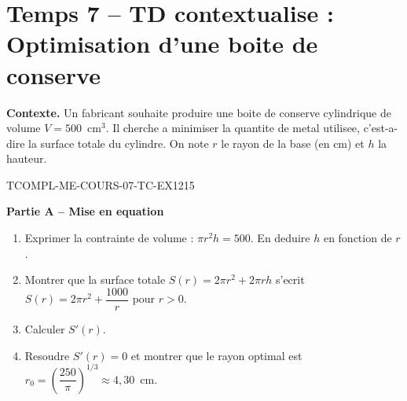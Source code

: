 

\section*{Temps 7 -- TD contextualise : Optimisation d'une boite de conserve}

\textbf{Contexte.} Un fabricant souhaite produire une boite de conserve cylindrique de volume $V = 500$~cm$^3$. Il cherche a minimiser la quantite de metal utilisee, c'est-a-dire la surface totale du cylindre. On note $r$ le rayon de la base (en cm) et $h$ la hauteur.

\bigskip


\begin{exercice}{TCOMPL-ME-COURS-07-TC-EX1}{2}{15}

\textbf{Partie A -- Mise en equation}

\begin{enumerate}
  \item Exprimer la contrainte de volume : $\pi r^2 h = 500$. En deduire $h$ en fonction de $r$.
  \item Montrer que la surface totale $S(r) = 2\pi r^2 + 2\pi r h$ s'ecrit $S(r) = 2\pi r^2 + \dfrac{1000}{r}$ pour $r > 0$.
  \item Calculer $S'(r)$.
  \item Resoudre $S'(r) = 0$ et montrer que le rayon optimal est $r_0 = \left(\dfrac{250}{\pi}\right)^{1/3} \approx 4{,}30$~cm.
\end{enumerate}

\end{exercice}

